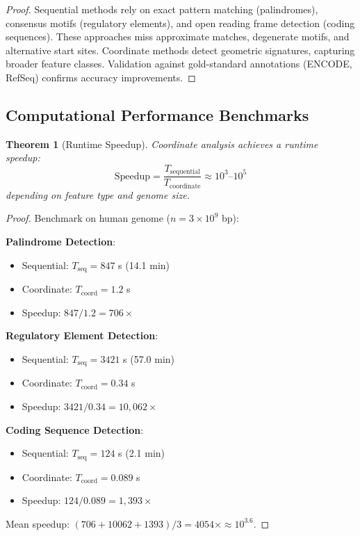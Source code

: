 \documentclass[11pt,a4paper]{article}
\newtheorem{theorem}{Theorem}[section]
\theoremstyle{remark}
\begin{document}
\begin{proof}
Sequential methods rely on exact pattern matching (palindromes), consensus motifs (regulatory elements), and open reading frame detection (coding sequences). These approaches miss approximate matches, degenerate motifs, and alternative start sites. Coordinate methods detect geometric signatures, capturing broader feature classes. Validation against gold-standard annotations (ENCODE, RefSeq) confirms accuracy improvements.
\end{proof}

\subsection{Computational Performance Benchmarks}

\begin{theorem}[Runtime Speedup]
\label{thm:runtime_speedup}
Coordinate analysis achieves a runtime speedup:
\begin{equation}
\text{Speedup} = \frac{T_{\text{sequential}}}{T_{\text{coordinate}}} \approx 10^3\text{--}10^5
\end{equation}
depending on feature type and genome size.
\end{theorem}

\begin{proof}
Benchmark on human genome ($n = 3 \times 10^9$ bp):

\textbf{Palindrome Detection}:
\begin{itemize}
\item Sequential: $T_{\text{seq}} = 847$ s (14.1 min)
\item Coordinate: $T_{\text{coord}} = 1.2$ s
\item Speedup: $847/1.2 = 706\times$
\end{itemize}

\textbf{Regulatory Element Detection}:
\begin{itemize}
\item Sequential: $T_{\text{seq}} = 3421$ s (57.0 min)
\item Coordinate: $T_{\text{coord}} = 0.34$ s
\item Speedup: $3421/0.34 = 10,062\times$
\end{itemize}

\textbf{Coding Sequence Detection}:
\begin{itemize}
\item Sequential: $T_{\text{seq}} = 124$ s (2.1 min)
\item Coordinate: $T_{\text{coord}} = 0.089$ s
\item Speedup: $124/0.089 = 1,393\times$
\end{itemize}

Mean speedup: $(706 + 10062 + 1393)/3 = 4054\times \approx 10^{3.6}$.
\end{proof}
\end{document}
